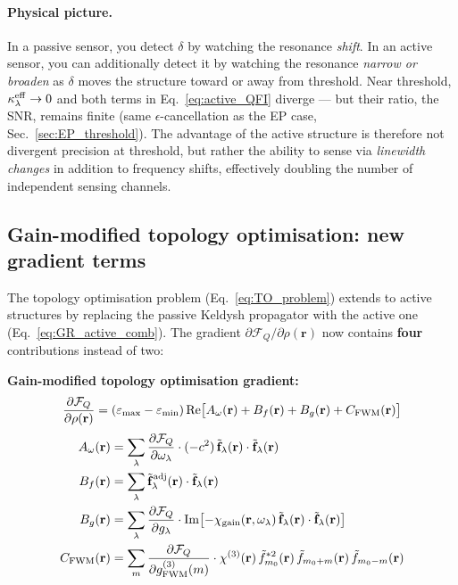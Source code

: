 \documentclass[12pt]{article}
\newcommand{\tf}{\tilde{\mathbf{f}}}
\begin{document}
\paragraph{Physical picture.}  In a passive sensor, you detect $\delta$
by watching the resonance \emph{shift}.  In an active sensor, you can
additionally detect it by watching the resonance \emph{narrow or broaden}
as $\delta$ moves the structure toward or away from threshold.  Near
threshold, $\kappa_\lambda^{\rm eff}\to 0$ and both terms in
Eq.~\eqref{eq:active_QFI} diverge --- but their ratio, the SNR, remains
finite (same $\epsilon$-cancellation as the EP case, Sec.~\ref{sec:EP_threshold}).
The advantage of the active structure is therefore not divergent precision
at threshold, but rather the ability to sense via \emph{linewidth
changes} in addition to frequency shifts, effectively doubling the number
of independent sensing channels.

\subsection{Gain-modified topology optimisation: new gradient terms}
\label{sec:active_TO}

The topology optimisation problem
(Eq.~\ref{eq:TO_problem}) extends to active structures by replacing the
passive Keldysh propagator with the active one (Eq.~\ref{eq:GR_active_comb}).
The gradient $\partial\mathcal{F}_Q/\partial\rho(\mathbf{r})$ now
contains \textbf{four} contributions instead of two:

\begin{keyresult}
\textbf{Gain-modified topology optimisation gradient:}
\begin{equation}
  \frac{\partial\mathcal{F}_Q}{\partial\rho(\mathbf{r})} =
  (\varepsilon_{\rm max}-\varepsilon_{\rm min})\,\mathrm{Re}\bigl[
  A_\omega(\mathbf{r}) + B_f(\mathbf{r})
  + B_g(\mathbf{r}) + C_{\rm FWM}(\mathbf{r})\bigr]
  \label{eq:active_gradient}
\end{equation}
\begin{align}
  A_\omega(\mathbf{r}) &=
  \sum_\lambda\frac{\partial\mathcal{F}_Q}{\partial\omega_\lambda}\cdot
  (-c^2)\,\tf_\lambda(\mathbf{r})\cdot\tf_\lambda(\mathbf{r})
  \label{eq:grad_Aomega}\\
  B_f(\mathbf{r}) &=
  \sum_\lambda \tf_\lambda^{\rm adj}(\mathbf{r})\cdot\tf_\lambda(\mathbf{r})
  \label{eq:grad_Bf}\\
  B_g(\mathbf{r}) &=
  \sum_\lambda\frac{\partial\mathcal{F}_Q}{\partial g_\lambda}\cdot
  \mathrm{Im}\bigl[-\chi_{\rm gain}(\mathbf{r},\omega_\lambda)\,
  \tf_\lambda(\mathbf{r})\cdot\tf_\lambda(\mathbf{r})\bigr]
  \label{eq:grad_Bg}\\
  C_{\rm FWM}(\mathbf{r}) &=
  \sum_m\frac{\partial\mathcal{F}_Q}{\partial g^{(3)}_{\rm FWM}(m)}\cdot
  \chi^{(3)}(\mathbf{r})\,
  \tilde{f}_{m_0}^{*2}(\mathbf{r})\,
  \tilde{f}_{m_0+m}(\mathbf{r})\,\tilde{f}_{m_0-m}(\mathbf{r})
  \label{eq:grad_CFWM}
\end{align}
\end{keyresult}
\end{document}

